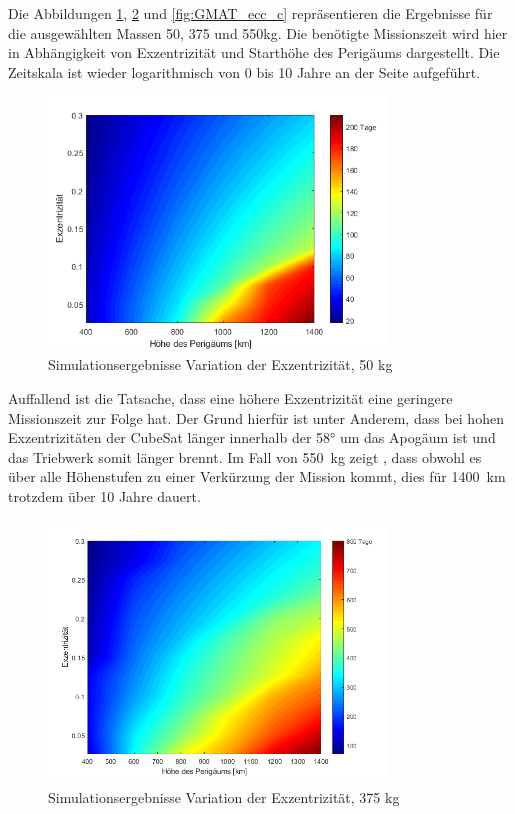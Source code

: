 	Die Abbildungen \ref{fig:GMAT_ecc_a}, \ref{fig:GMAT_ecc_b} und \ref{fig:GMAT_ecc_c} repräsentieren die Ergebnisse für die ausgewählten Massen \num{50}, \num{375} und \num{550}\si{\kilogram}. Die benötigte Missionszeit wird hier in Abhängigkeit von Exzentrizität und Starthöhe des Perigäums dargestellt. Die Zeitskala ist wieder logarithmisch von \num{0} bis \num{10} Jahre an der Seite aufgeführt.


\begin{figure}[h]
	\centering
		\includegraphics[width=0.80\textwidth]{./graphics/GMAT/ecc_perigee_50kg.png}
		\caption{Simulationsergebnisse Variation der Exzentrizität, 50 kg}
	\label{fig:GMAT_ecc_a}
\end{figure}

	Auffallend ist die Tatsache, dass eine höhere Exzentrizität eine geringere Missionszeit zur Folge hat. Der Grund hierfür ist unter Anderem, dass bei hohen Exzentrizitäten der CubeSat länger innerhalb der \num{58}° um das Apogäum ist und das Triebwerk somit länger brennt. Im Fall von \SI{550}{\kilogram} zeigt , dass obwohl es über alle Höhenstufen zu einer Verkürzung der Mission kommt, dies für \SI{1400}{\kilo\metre} trotzdem über \num{10} Jahre dauert. 
	
	\begin{figure}[h]
	\centering
		\includegraphics[width=0.80\textwidth]{./graphics/GMAT/ecc_perigee_375kg.png}
		\caption{Simulationsergebnisse Variation der Exzentrizität, 375 kg}
	\label{fig:GMAT_ecc_b}
\end{figure}

